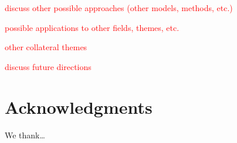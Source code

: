 \documentclass[12pt, a4paper, final, fleqn]{article}
\begin{document}
\textcolor{red}{discuss other possible approaches (other models, methods, etc.)}

\textcolor{red}{possible applications to other fields, themes, etc.}

\textcolor{red}{other collateral themes}

\textcolor{red}{discuss future directions}

\section*{Acknowledgments}

We thank\dots 




\clearpage

\end{document}
